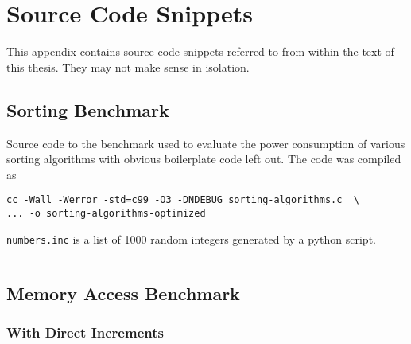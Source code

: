 \chapter{Source Code Snippets}

\label{AppendixB}

This appendix contains source code snippets referred to from within
the text of this thesis.  They may not make sense in isolation.


\section{Sorting Benchmark}
\label{code:sorting-benchmark}

Source code to the benchmark used to evaluate the power consumption of
various sorting algorithms with obvious boilerplate code left out.
The code was compiled as

\begin{verbatim}
cc -Wall -Werror -std=c99 -O3 -DNDEBUG sorting-algorithms.c  \
... -o sorting-algorithms-optimized
\end{verbatim}

\texttt{numbers.inc} is a list of 1000 random integers generated by a
python script.

\inputminted[linenos, frame=lines, baselinestretch=1, firstline=15, lastline=92]{cpp}{source/sorting-algorithms.inc}

\section{Memory Access Benchmark}

\subsection{With Direct Increments}
\label{code:direct-mem}


